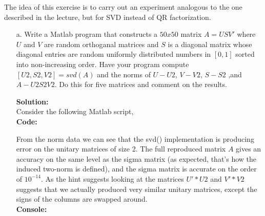 \documentclass[12pt]{article}
\makeatletter
\theoremstyle{homework}
\newenvironment{exercise}[1]
{\def\@currentlabel{#1}\exercisecore}
{\endexercisecore}
\newcommand{\localhead}[1]{\par\smallskip\noindent\textbf{#1}\nobreak\\}%
\newcommand\solution{\localhead{Solution:}}
\makeatother
\begin{document}
\vspace{1in}


\begin{exercise}{16.2} The idea of this exercise is to carry out an experiment analogous to the one described in the lecture, but 
  for SVD instead of QR factorization. \\
  \begin{enumerate}
    \item[a.] Write a Matlab program that constructs a $50x50$ matrix $A = USV'$ where $U$ and $V$ are random orthoganal matrices 
    and $S$ is a diagonal matrix whose diagonal entries are random uniformly distributed numbers in $[0,1]$ sorted into non-increasing order. 
    Have your program compute $[U2, S2, V2] = svd(A)$ and the norms of $U - U2$, $V - V2$, $S - S2$ ,and $A - U2S2V2$. Do this for five matrices and comment 
    on the results.\\
    \solution Consider the following Matlab script, \\
    \textbf{Code:}
    \begin{center}
      
    \end{center} 
    From the norm data we can see that the svd() implementation is producing error on the unitary matrices of size 2. The full reproduced 
    matrix $A$ gives an accuracy on the same level as the sigma matrix (as expected, that's how the induced two-norm is defined), and the sigma matrix is accurate on the order of $10^{-14}$. As the hint suggests 
    looking at the matrices $U'*U2$ and $V'*V2$ suggests that we actually produced very similar unitary matrices, except the signs of the columns are swapped around. \\
    \textbf{Console:}
    \begin{center}
      
    \end{center} 

    \vspace{.15in}


\end{enumerate}
\end{exercise}
\end{document}
